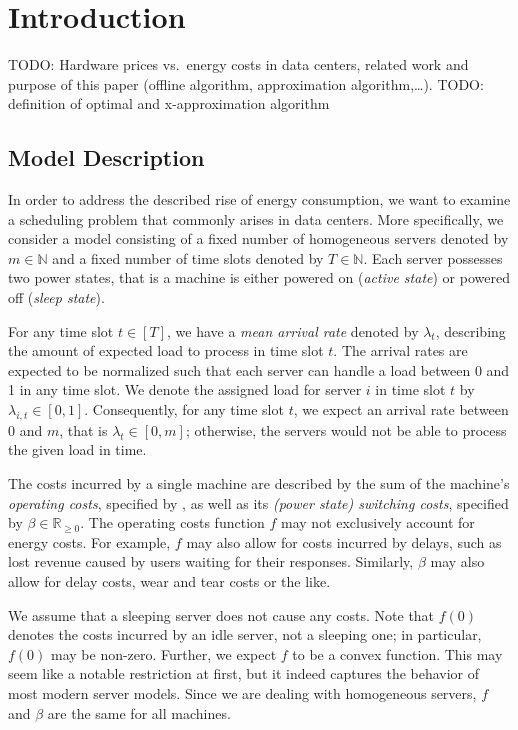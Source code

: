 
\chapter{Introduction}
TODO: Hardware prices vs.\ energy costs in data centers, related work and purpose of this paper (offline algorithm, approximation algorithm,\ldots).
TODO: definition of optimal and x-approximation algorithm

\section{Model Description}\label{sec:model_descr}
In order to address the described rise of energy consumption, we want to examine a scheduling problem that commonly arises in data centers. More specifically, we consider a model consisting of a fixed number of homogeneous servers denoted by $m\in\mathbb{N}$ and a fixed number of time slots denoted by $T\in\mathbb{N}$. Each server possesses two power states, that is a machine is either powered on (\textit{active state}) or powered off (\textit{sleep state}).
	
For any time slot $t\in[T]$, we have a \textit{mean arrival rate} denoted by $\lambda_t$, describing the amount of expected load to process in time slot $t$. The arrival rates are expected to be normalized such that each server can handle a load between 0 and 1 in any time slot. We denote the assigned load for server $i$ in time slot $t$ by $\lambda_{i,t}\in[0,1]$. Consequently, for any time slot $t$, we expect an arrival rate between 0 and $m$, that is $\lambda_t\in[0,m]$; otherwise, the servers would not be able to process the given load in time.

The costs incurred by a single machine are described by the sum of the machine's \textit{operating costs}, specified by , as well as its \textit{(power state) switching costs}, specified by $\beta\in\mathbb{R}_{\ge 0}$. 
The operating costs function $f$ may not exclusively account for energy costs. For example, $f$ may also allow for costs incurred by delays, such as lost revenue caused by users waiting for their responses. Similarly, $\beta$ may also allow for delay costs, wear and tear costs or the like.\parencite{dyn-right-sizing}

We assume that a sleeping server does not cause any costs. Note that $f(0)$ denotes the costs incurred by an idle server, not a sleeping one; in particular, $f(0)$ may be non-zero. Further, we expect $f$ to be a convex function. This may seem like a notable restriction at first, but it indeed captures the behavior of most modern server models. Since we are dealing with homogeneous servers, $f$ and $\beta$ are the same for all machines.


